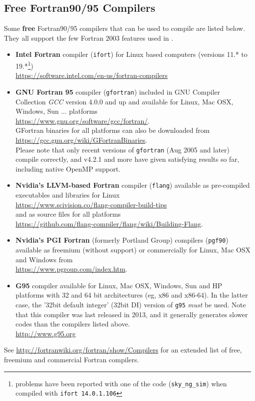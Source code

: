 \documentclass[12pt,twoside]{article}
\begin{document}
\subsection{Free Fortran90/95 Compilers}
\label{sec:freef90compilers}
Some {\bf free} Fortran90/95 compilers that can be used to compile \healpix are listed below.
They all support the few Fortran 2003 features used in \healpixns. 
    \begin{itemize}
%
      \item {\bf Intel Fortran} compiler (\texttt{ifort}) for Linux based computers (versions
11.* to 19.*\footnote{problems have been reported with one of the code (\texttt{sky\_ng\_sim}) when compiled with
\texttt{ifort 14.0.1.106}}) \hfill \\
         \url{https://software.intel.com/en-us/fortran-compilers}
%
      \item {\bf GNU Fortran 95} compiler (\texttt{gfortran}) included in GNU Compiler Collection {\em GCC} version 4.0.0
         and up and available for Linux, Mac OSX, Windows, Sun ... platforms
         \hfill \\
          \url{https://www.gnu.org/software/gcc/fortran/}. \hfill \\
         GFortran binaries for all platforms can also be downloaded from  \hfill \\
          \url{https://gcc.gnu.org/wiki/GFortranBinaries}. \hfill \\
         Please note that only recent versions of \texttt{gfortran} (Aug 2005
         and later) compile \healpix correctly, and v4.2.1 and more have given satisfying
         results so far, including native OpenMP support.
%
     \item {\bf Nvidia's LLVM-based Fortran} compiler (\texttt{flang}) available as pre-compiled executables and libraries for Linux \hfill \\
\url{https://www.scivision.co/flang-compiler-build-tips} \hfill \\
and as source files for all platforms \hfill \\
\url{https://github.com/flang-compiler/flang/wiki/Building-Flang}.
%
     \item {\bf Nvidia's PGI Fortran} (formerly Portland Group) compilers (\texttt{pgf90}) available as freemium (without support) or commercially for Linux, Mac OSX and Windows from 
\hfill \\ \url{https://www.pgroup.com/index.htm}.
%
     \item {\bf G95} compiler available for Linux, Mac OSX, Windows, Sun and HP platforms with 32 and 64 bit architectures (eg, x86 and x86-64). In the latter case, the '32bit default integer' (32bit DI) version of \texttt{g95} {\em must} be used. Note that this compiler was last released in 2013, and it generally generates slower codes 
than the compilers listed above.
         \hfill \\ \url{http://www.g95.org}
    \end{itemize}
See \url{http://fortranwiki.org/fortran/show/Compilers} for an extended list of free, freemium and commercial Fortran compilers.
\end{document}
